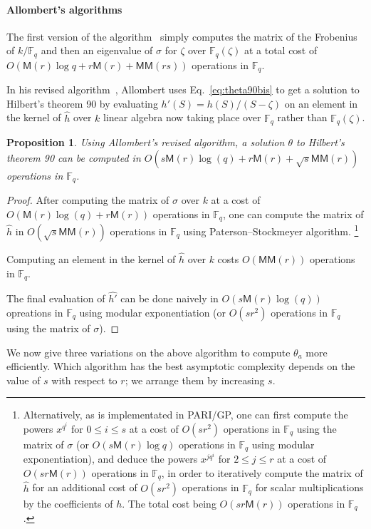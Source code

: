 \documentclass[12pt]{article}
\theoremstyle{plain}
\newtheorem{proposition}[theorem]{Proposition}
\theoremstyle{definition}
\def\F{\ensuremath{\mathbb{F}}}
\def\MM{\ensuremath{\mathsf{M}}}
\def\MMM{\ensuremath{\mathsf{MM}}}
\newcounter{algorithm}
\begin{document}
\paragraph{Allombert's algorithms}
The first version of the algorithm~\cite{Allombert02}
simply computes the matrix of the Frobenius of $k/\F_q$
and then an eigenvalue of $\sigma$ for $\zeta$ over $\F_q(\zeta)$
at a total cost of $O(\MM(r) \log q + r \MM(r) + \MMM(rs))$
operations in $\F_q$.

In his revised algorithm~\cite{Allombert02-rev}, Allombert uses
Eq.~\eqref{eq:theta90bis} to get
a solution to Hilbert's theorem 90
by evaluating $h'(S)=h(S)/(S-\zeta)$
on an element in the kernel of $\hat{h}$ over $k$
linear algebra now taking place over $\F_q$ rather than $\F_q(\zeta)$.

\begin{proposition}
Using Allombert's revised algorithm,
a solution $\theta$ to Hilbert's theorem 90 can be computed in
$O(s \MM(r) \log(q) + r \MM(r) + \sqrt{s} \MMM(r))$ operations in $\F_q$.
\end{proposition}

\begin{proof}
After computing the matrix of $\sigma$ over $k$ at a cost of
$O(\MM(r) \log(q) + r \MM(r))$ operations in $\F_q$, one can compute
the matrix of $\hat{h}$ in $O(\sqrt{s} \MMM(r))$ operations in $\F_q$
using Paterson--Stockmeyer algorithm.%
\footnote{
Alternatively, as is implementated in PARI/GP,
one can first compute the powers $x^{q^i}$ for $0 \leq i \leq s$
at a cost of $O(s r^2)$ operations in $\F_q$ using the matrix of $\sigma$
(or $O(s \MM(r) \log q)$ operations in $\F_q$ using modular exponentiation),
and deduce the powers $x^{j q^i}$ for $2 \leq j \leq r$
at a cost of $O(s r \MM(r))$ operations in $\F_q$,
in order to iteratively compute the matrix of $\hat{h}$
for an additional cost of $O(s r^2)$ operations in $\F_q$ for scalar
multiplications by the coefficients of $h$.
The total cost being $O(s r \MM(r))$ operations in $\F_q$.
}

Computing an element in the kernel of $\hat{h}$
over $k$ costs $O(\MMM(r))$ operations in $\F_q$.

The final evaluation of $\hat{h'}$ can be done
naively in $O(s \MM(r) \log(q))$ opreations in $\F_q$
using modular exponentiation
(or $O(s r^2)$ operations in $\F_q$ using the matrix of $\sigma$).
\end{proof}

We now give three variations on the above algorithm to compute $\theta_a$
more efficiently.
Which algorithm has the best asymptotic complexity depends on the
value of $s$ with respect to $r$; we arrange them by increasing $s$.
\end{document}
